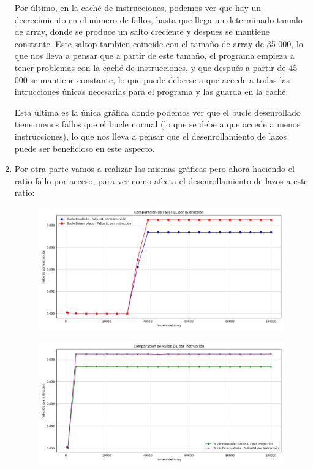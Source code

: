 \documentclass[a4paper,twocolumn]{article}
\begin{document}
\begin{enumerate}
    Por último, en la caché de instrucciones, podemos ver que hay un decrecimiento en el número de fallos, hasta que llega un determinado tamalo de array, donde se produce un salto creciente y despues se mantiene constante. Este saltop tambien coincide con el tamaño de array de 35 000, lo que nos lleva a pensar que a partir de este tamaño, el programa empieza a tener problemas con la caché de instrucciones, y que después a partir de 45 000 se mantiene constante, lo que puede deberse a que accede a todas las intrucciones únicas necesarias para el programa y las guarda en la caché.

    Esta última es la única gráfica donde podemos ver que el bucle desenrollado tiene menos fallos que el bucle normal (lo que se debe a que accede a menos instrucciones), lo que nos lleva a pensar que el desenrollamiento de lazos puede ser beneficioso en este aspecto.

    \item Por otra parte vamos a realizar las mismas gráficas pero ahora haciendo el ratio fallo por acceso, para ver como afecta el desenrollamiento de lazos a este ratio:

    \begin{figure}[H]
        \centering
        \includegraphics[width=\columnwidth]{img/Fallos_LL.png}
        \label{fig:real_vs_cpu_time}
    \end{figure}

    \begin{figure}[H]
        \centering
        \includegraphics[width=\columnwidth]{img/Fallos_D1.png}
        \label{fig:real_vs_cpu_time}
    \end{figure}


\end{enumerate}
\end{document}
